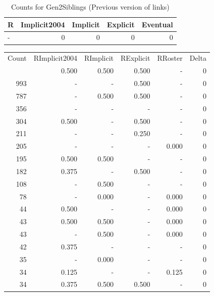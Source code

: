 \documentclass[a4paper]{article}\usepackage[]{graphicx}\usepackage[]{color}
\begin{document}
\begin{table}[ht]
\centering
{\large
\begin{tabular}{lrrrr}
  \hline
R & Implicit2004 & Implicit & Explicit & Eventual \\ 
  \hline
- &   0 &   0 &   0 &   0 \\ 
   \hline
\end{tabular}
}
\caption{Counts for Gen2Siblings (Previous version of links)} 
\end{table}



\begin{table}[ht]
\centering
\begin{tabular}{rrrrrr}
  \hline
Count & RImplicit2004 & RImplicit & RExplicit & RRoster & Delta \\ 
  \rowcolor{goodColor}  \hline
1192 & 0.500 & 0.500 & 0.500 & - & 0 \\ 
   \rowcolor{sosoColor} 993 & - & - & 0.500 & - & 0 \\ 
   \rowcolor{goodColor} 787 & - & 0.500 & 0.500 & - & 0 \\ 
   \rowcolor{nullColor} 356 & - & - & - & - & 0 \\ 
   \rowcolor{sosoColor} 304 & 0.500 & - & 0.500 & - & 0 \\ 
   \rowcolor{sosoColor} 211 & - & - & 0.250 & - & 0 \\ 
   \rowcolor{nullColor} 205 & - & - & - & 0.000 & 0 \\ 
  195 & 0.500 & 0.500 & - & - & 0 \\ 
   \rowcolor{sosoColor} 182 & 0.375 & - & 0.500 & - & 0 \\ 
  108 & - & 0.500 & - & - & 0 \\ 
  78 & - & 0.000 & - & 0.000 & 0 \\ 
   \rowcolor{nullColor} 44 & 0.500 & - & - & 0.000 & 0 \\ 
  43 & 0.500 & 0.500 & - & 0.000 & 0 \\ 
  43 & - & 0.500 & - & 0.000 & 0 \\ 
   \rowcolor{nullColor} 42 & 0.375 & - & - & - & 0 \\ 
  35 & - & 0.000 & - & - & 0 \\ 
   \rowcolor{nullColor} 34 & 0.125 & - & - & 0.125 & 0 \\ 
   \rowcolor{goodColor} 34 & 0.375 & 0.500 & 0.500 & - & 0 \\ 

\end{tabular}
\end{table}
\end{document}
